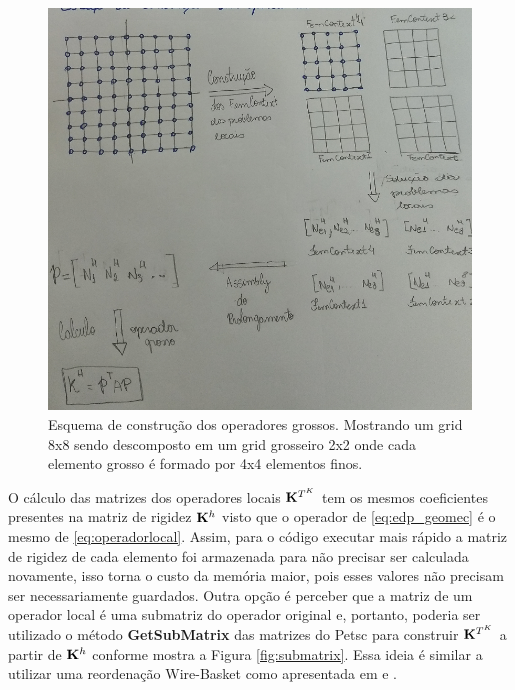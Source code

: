 \begin{figure}[!htbp]
\centering
\includegraphics[width=\textwidth]{chap07/figs/esquemaprolongamento.png}
\caption{Esquema de construção dos operadores grossos. Mostrando um grid 8x8 sendo descomposto em um grid grosseiro 2x2 onde cada elemento grosso é formado por 4x4 elementos finos.}
\label{fig:esquemaconstrucao}
\end{figure}


O cálculo das matrizes dos operadores locais $\mathbf{K}^{T^K}$ tem os mesmos coeficientes presentes na matriz de rigidez $\mathbf{K}^h$ visto que o operador de \eqref{eq:edp_geomec} é o mesmo de \eqref{eq:operadorlocal}. Assim, para o código executar mais rápido a matriz de rigidez de cada elemento foi armazenada para não precisar ser calculada novamente, isso torna o custo da memória maior, pois esses valores não precisam ser necessariamente guardados. Outra opção é perceber que a matriz de um operador local é uma submatriz do operador original e, portanto, poderia ser utilizado o método \textbf{GetSubMatrix} das matrizes do Petsc para construir $\mathbf{K}^{T^K}$ a partir de $\mathbf{K}^h$ conforme mostra a Figura \ref{fig:submatrix}. Essa ideia é similar a utilizar uma reordenação Wire-Basket como apresentada em \cite{casteletto} e \cite{irina}.

